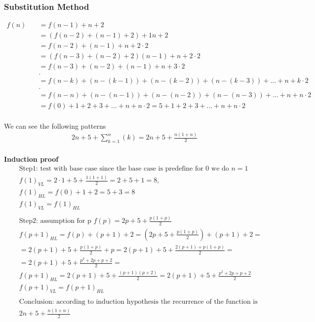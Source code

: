 \subsubsection{Substitution Method}
\begin{align*}
  f(n) &\quad = f(n-1) + n + 2  \\
  &\quad = (f(n-2) + (n-1) + 2) +1n +2 \\               &\quad = f(n-2) + (n-1) + n +2 \cdot 2 \\
  &\quad = (f(n-3) + (n-2) + 2) (n-1) + n +2 \cdot 2 \\ &\quad = f(n-3) +(n-2) + (n-1) + n +3 \cdot 2 \\
  &\quad . \\
  &\quad = f(n-k) + (n -(k-1)) + (n -(k-2)) + (n -(k-3)) + \ldots + n +k \cdot 2  \\
  &\quad . \\
  &\quad = f(n-n) + (n -(n-1)) + (n -(n-2)) + (n -(n-3)) + \ldots + n +n \cdot 2 \\
  &\quad = f(0) +1 +2 +3 + \ldots + n +n \cdot 2 = 5 +1 +2 +3 + \ldots + n +n \cdot 2\\
\end{align*}

We can see the following patterns
\begin{align*}
  &\quad 2n + 5 + \displaystyle\sum_{k=1}^{n}(k) = 2n + 5 + \frac{n(1+n)}{2} \\
\end{align*}

\noindent\textbf{Induction proof}
\begin{align*}
  &\quad  \text{Step1: test with base case since the base case is predefine for 0 we do } n=1  \\
  &\quad  {f(1)}_{VL} = 2 \cdot 1 + 5 + \frac{1(1+1)}{2} = 2 +5 +1 = 8, \\
  &\quad  {f(1)}_{HL} = f(0) + 1 +2 = 5 +3 = 8 \\
  &\quad  {f(1)}_{VL} = {f(1)}_{HL} \\
  &\quad  \\
  &\quad  \text{Step2: assumption for p } f(p) = 2p + 5 + \frac{p(1+p)}{2} \\
  &\quad  {f(p+1)}_{HL} = f(p) +(p+1) +2 = (2p +5 +\frac{p(1+p)}{2}) + (p+1) + 2 = \\
  &\quad  = 2(p+1) +5 +\frac{p(1+p)}{2} +p = 2(p+1) +5 +\frac{2(p+1)+p(1+p)}{2} = \\
  &\quad  = 2(p+1) +5 +\frac{p^2 +2p +p +2}{2} = \\
  &\quad  {f(p+1)}_{HL} = 2(p+1) + 5 + \frac{(p+1)(p+2)}{2} = 2(p+1) + 5 + \frac{p^2 +2p +p +2}{2}  \\
  &\quad  {f(p+1)}_{VL} = {f(p+1)}_{HL} \\
  &\quad  \\
  &\quad  \text{Conclusion: according to induction hypothesis the recurrence of the function is equal to } \\
  &\quad  2n + 5 + \frac{n(1+n)}{2} 
\end{align*}


